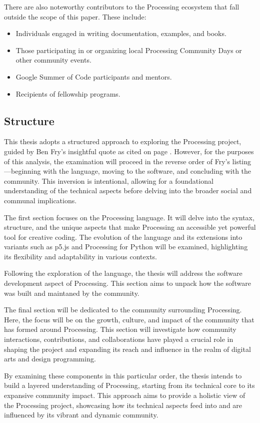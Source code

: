   There are also noteworthy contributors to the Processing ecosystem that fall outside the scope of this paper. These include:

  \begin{itemize}
      \item Individuals engaged in writing documentation, examples, and books.
      \item Those participating in or organizing local Processing Community Days or other community events.
      \item Google Summer of Code participants and mentors.
      \item Recipients of fellowship programs.
  \end{itemize}

\subsection{Structure}
This thesis adopts a structured approach to exploring the Processing project, guided by Ben Fry's insightful quote as cited on page \pageref{fry_quote}. However, for the purposes of this analysis, the examination will proceed in the reverse order of Fry’s listing—beginning with the language, moving to the software, and concluding with the community. This inversion is intentional, allowing for a foundational understanding of the technical aspects before delving into the broader social and communal implications.

The first section focuses on the Processing language. It will delve into the syntax, structure, and the unique aspects that make Processing an accessible yet powerful tool for creative coding. The evolution of the language and its extensions into variants such as p5.js and Processing for Python will be examined, highlighting its flexibility and adaptability in various contexts.

Following the exploration of the language, the thesis will address the software development aspect of Processing. This section aims to unpack how the software was built and maintaned by the community.

The final section will be dedicated to the community surrounding Processing. Here, the focus will be on the growth, culture, and impact of the community that has formed around Processing. This section will investigate how community interactions, contributions, and collaborations have played a crucial role in shaping the project and expanding its reach and influence in the realm of digital arts and design programming.

By examining these components in this particular order, the thesis intends to build a layered understanding of Processing, starting from its technical core to its expansive community impact. This approach aims to provide a holistic view of the Processing project, showcasing how its technical aspects feed into and are influenced by its vibrant and dynamic community.